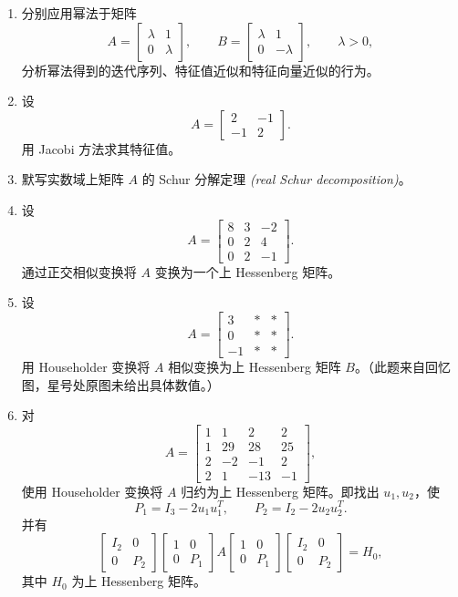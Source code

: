 \documentclass{article}
\newcommand{\eng}[1]{\texorpdfstring{{\normalfont\rmfamily\itshape\textcolor{blue!65!black}{(#1)}}}{(#1)}}
\begin{document}
\begin{enumerate}
  \item 分别应用幂法于矩阵
  \[
    A=\begin{bmatrix}\lambda&1\\0&\lambda\end{bmatrix},\qquad
    B=\begin{bmatrix}\lambda&1\\0&-\lambda\end{bmatrix},\qquad \lambda>0,
  \]
  分析幂法得到的迭代序列、特征值近似和特征向量近似的行为。

  \item 设
  \[
    A=\begin{bmatrix}2&-1\\-1&2\end{bmatrix}.
  \]
  用 Jacobi 方法求其特征值。

  \item 默写实数域上矩阵 $A$ 的 Schur 分解定理 \eng{real Schur decomposition}。

  \item 设
  \[
    A=\begin{bmatrix}8&3&-2\\0&2&4\\0&2&-1\end{bmatrix}.
  \]
  通过正交相似变换将 $A$ 变换为一个上 Hessenberg 矩阵。

  \item 设
  \[
    A=\begin{bmatrix}3&*&*\\0&*&*\\-1&*&*\end{bmatrix}.
  \]
  用 Householder 变换将 $A$ 相似变换为上 Hessenberg 矩阵 $B$。（此题来自回忆图，星号处原图未给出具体数值。）

  \item 对
  \[
    A=\begin{bmatrix}
      1&1&2&2\\
      1&29&28&25\\
      2&-2&-1&2\\
      2&1&-13&-1
    \end{bmatrix},
  \]
  使用 Householder 变换将 $A$ 归约为上 Hessenberg 矩阵。即找出 $u_1,u_2$，使
  \[
    P_1=I_3-2u_1u_1^T,\qquad P_2=I_2-2u_2u_2^T.
  \]
  并有
  \[
    \begin{bmatrix}I_2&0\\0&P_2\end{bmatrix}
    \begin{bmatrix}1&0\\0&P_1\end{bmatrix}
    A
    \begin{bmatrix}1&0\\0&P_1\end{bmatrix}
    \begin{bmatrix}I_2&0\\0&P_2\end{bmatrix}
    =H_0,
  \]
  其中 $H_0$ 为上 Hessenberg 矩阵。


\end{enumerate}
\end{document}
